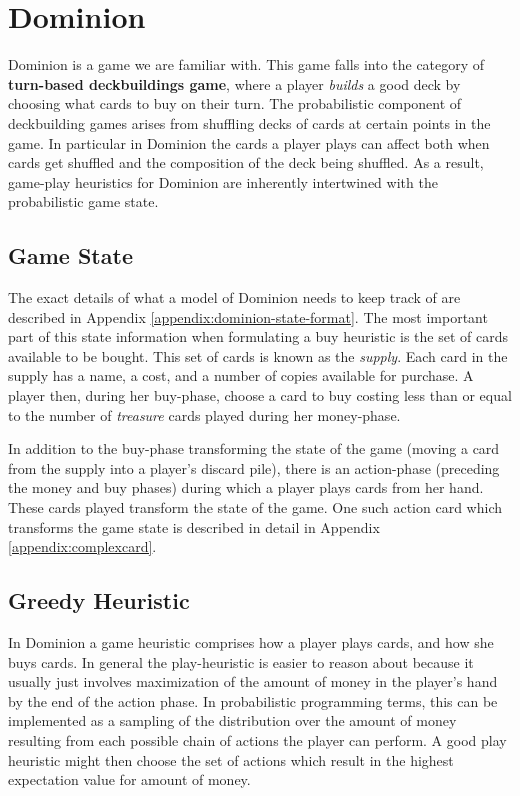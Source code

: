 
\section{Dominion} \label{sec:dom}

Dominion is a game we are familiar with. This game falls into the category of
{\bf turn-based
deckbuildings game}, where a player \emph{builds} a good deck by choosing what
cards to buy on their turn. The probabilistic component of deckbuilding games
arises from shuffling decks of cards at certain points in the game. In particular
in Dominion the cards a player plays can affect both when cards get shuffled
and the composition of the deck being shuffled. As a result, game-play heuristics
for Dominion are inherently intertwined with the probabilistic game state.

\subsection{Game State}

The exact details of what a model of Dominion needs to keep track of are
described in Appendix \ref{appendix:dominion-state-format}. The most important
part of this state information when formulating a buy heuristic is the set
of cards available to be bought. This set of cards is known as the \emph{supply}.
Each card in the supply has a name, a cost, and a number of copies available for
purchase. A player then, during her buy-phase, choose a card to buy costing
less than or equal to the number of \emph{treasure} cards played during her
money-phase.

In addition to the buy-phase transforming the state of the game (moving a
card from the supply into a player's discard pile), there is an action-phase
(preceding the money and buy phases) during which a player plays cards
from her hand. These cards played transform the state of the game. One
such action card which transforms the game state is described in detail
in Appendix \ref{appendix:complexcard}.

\subsection{Greedy Heuristic} \label{sec:dom:heuristics}

In Dominion a game heuristic comprises how a player plays cards, and how
she buys cards. In general the play-heuristic is easier to reason about
because it usually just involves maximization of the amount of money
in the player's hand by the end of the action phase. In probabilistic
programming terms, this can be implemented as a sampling of the
distribution over the amount of money resulting from each possible
chain of actions the player can perform. A good play heuristic might then
choose the set of actions which result in the highest expectation value
for amount of money.

